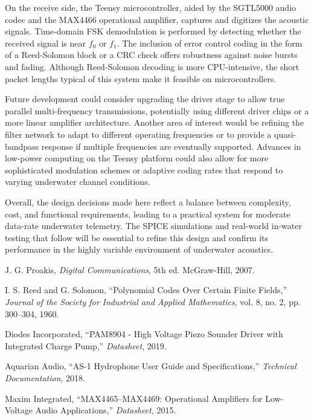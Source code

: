 On the receive side, the Teensy microcontroller, aided by the SGTL5000 audio codec and the MAX4466 operational amplifier, captures and digitizes the acoustic signals. Time-domain FSK demodulation is performed by detecting whether the received signal is near \(f_0\) or \(f_1\). The inclusion of error control coding in the form of a Reed-Solomon block or a CRC check offers robustness against noise bursts and fading. Although Reed-Solomon decoding is more CPU-intensive, the short packet lengths typical of this system make it feasible on microcontrollers.

Future development could consider upgrading the driver stage to allow true parallel multi-frequency transmissions, potentially using different driver chips or a more linear amplifier architecture. Another area of interest would be refining the filter network to adapt to different operating frequencies or to provide a quasi-bandpass response if multiple frequencies are eventually supported. Advances in low-power computing on the Teensy platform could also allow for more sophisticated modulation schemes or adaptive coding rates that respond to varying underwater channel conditions. 

Overall, the design decisions made here reflect a balance between complexity, cost, and functional requirements, leading to a practical system for moderate data-rate underwater telemetry. The SPICE simulations and real-world in-water testing that follow will be essential to refine this design and confirm its performance in the highly variable environment of underwater acoustics.

\vspace{0.5cm}
\begin{thebibliography}{99}

J. G. Proakis, \emph{Digital Communications}, 5th ed. McGraw-Hill, 2007.

I. S. Reed and G. Solomon, ``Polynomial Codes Over Certain Finite Fields,'' \emph{Journal of the Society for Industrial and Applied Mathematics}, vol. 8, no. 2, pp. 300--304, 1960.

Diodes Incorporated, ``PAM8904 - High Voltage Piezo Sounder Driver with Integrated Charge Pump,'' \emph{Datasheet}, 2019.

Aquarian Audio, ``AS-1 Hydrophone User Guide and Specifications,'' \emph{Technical Documentation}, 2018.

Maxim Integrated, ``MAX4465–MAX4469: Operational Amplifiers for Low-Voltage Audio Applications,'' \emph{Datasheet}, 2015.

\end{thebibliography}



